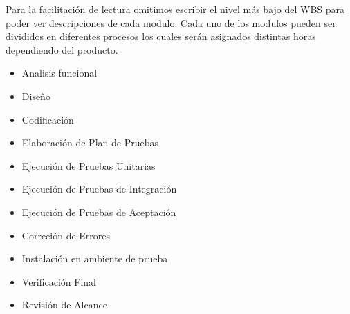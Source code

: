 Para la facilitación de lectura omitimos escribir el nivel más bajo del WBS para poder ver descripciones de cada modulo. Cada uno de los modulos pueden ser divididos en diferentes procesos
los cuales serán asignados distintas horas dependiendo del producto.
\begin{itemize}
 \item Analisis funcional
 \item Diseño
 \item Codificación
 \item Elaboración de Plan de Pruebas
 \item Ejecución de Pruebas Unitarias
 \item Ejecución de Pruebas de Integración
 \item Ejecución de Pruebas de Aceptación
 \item Correción de Errores
 \item Instalación en ambiente de prueba
 \item Verificación Final
 \item Revisión de Alcance
\end{itemize}	
